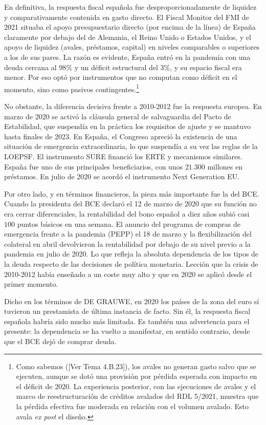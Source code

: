 \documentclass[10pt,a4paper]{article}
\newcommand{\authorfont}[1]{{\fontfamily{EBGaramond-TLF}\selectfont #1}}
\begin{document}
En definitiva, la respuesta fiscal española fue desproporcionadamente de liquidez y comparativamente contenida en gasto directo. El Fiscal Monitor del FMI de 2021 situaba el apoyo presupuestario directo (por encima de la línea) de España claramente por debajo del de Alemania, el Reino Unido o Estados Unidos, y el apoyo de liquidez (avales, préstamos, capital) en niveles comparables o superiores a los de sus pares. La razón es evidente, España entró en la pandemia con una deuda cercana al $98\%$ y un déficit estructural del $3\%$, y su espacio fiscal era menor. Por eso optó por instrumentos que no computan como déficit en el momento, sino como pasivos contingentes.\footnote{
Como sabemos ([\authorfont{Ver Tema 4.B.23}]), los avales no generan gasto salvo que se ejecuten, aunque se dotó una provisión por pérdida esperada con impacto en el déficit de 2020. La experiencia posterior, con las ejecuciones de avales y el marco de reestructuración de créditos avalados del RDL 5/2021, muestra que la pérdida efectiva fue moderada en relación con el volumen avalado. Esto avala \textit{ex post} el diseño.
}

No obstante, la diferencia decisiva frente a 2010-2012 fue la respuesta europea. En marzo de 2020 se activó la cláusula general de salvaguardia del Pacto de Estabilidad, que suspendía en la práctica los requisitos de ajuste y se mantuvo hasta finales de 2023. En España, el Congreso apreció la existencia de una situación de emergencia extraordinaria, lo que suspendía a su vez las reglas de la LOEPSF. El instrumento SURE financió los ERTE y mecanismos similares. España fue uno de sus principales beneficiarios, con unos $21.300$ millones en préstamos. En julio de 2020 se acordó el instrumento Next Generation EU.

Por otro lado, y en términos financieros, la pieza más importante fue la del BCE. Cuando la presidenta del BCE declaró el 12 de marzo de 2020 que su función no era cerrar diferenciales, la rentabilidad del bono español a diez años subió casi $100$ puntos básicos en una semana. El anuncio del programa de compras de emergencia frente a la pandemia (PEPP) el 18 de marzo y la flexibilización del colateral en abril devolvieron la rentabilidad por debajo de su nivel previo a la pandemia en julio de 2020. Lo que refleja la absoluta dependencia de los tipos de la deuda respecto de las decisiones de política monetaria. Lección que la crisis de 2010-2012 había enseñado a un coste muy alto y que en 2020 se aplicó desde el primer momento.

Dicho en los términos de DE GRAUWE, en 2020 los países de la zona del euro sí tuvieron un prestamista de última instancia de facto. Sin él, la respuesta fiscal española habría sido mucho más limitada. Es también una advertencia para el presente: la dependencia se ha vuelto a manifestar, en sentido contrario, desde que el BCE dejó de comprar deuda.
\end{document}
